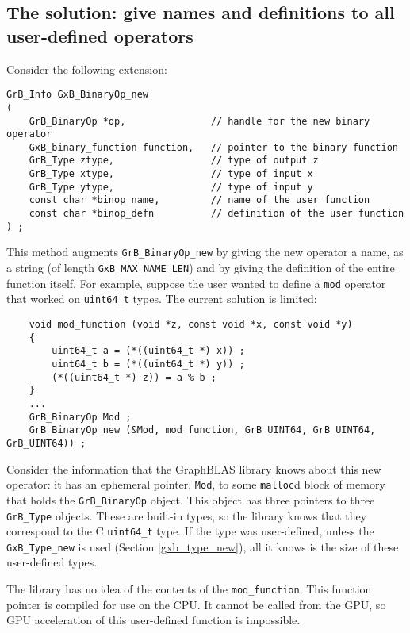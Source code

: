 \documentclass[12pt]{article}
\begin{document}
\subsection{The solution: give names and definitions to all user-defined
operators}

Consider the following extension:

{\footnotesize
\begin{verbatim}
GrB_Info GxB_BinaryOp_new
(
    GrB_BinaryOp *op,               // handle for the new binary operator
    GxB_binary_function function,   // pointer to the binary function
    GrB_Type ztype,                 // type of output z
    GrB_Type xtype,                 // type of input x
    GrB_Type ytype,                 // type of input y
    const char *binop_name,         // name of the user function
    const char *binop_defn          // definition of the user function
) ;
\end{verbatim}}

This method augments \verb'GrB_BinaryOp_new' by giving the new operator
a name, as a string (of length \verb'GxB_MAX_NAME_LEN') and by giving the
definition of the entire function itself.  For example, suppose the
user wanted to define a \verb'mod' operator that worked on \verb'uint64_t'
types.  The current solution is limited:

{\footnotesize
\begin{verbatim}
    void mod_function (void *z, const void *x, const void *y)
    {
        uint64_t a = (*((uint64_t *) x)) ;
        uint64_t b = (*((uint64_t *) y)) ;
        (*((uint64_t *) z)) = a % b ;
    }
    ...
    GrB_BinaryOp Mod ;
    GrB_BinaryOp_new (&Mod, mod_function, GrB_UINT64, GrB_UINT64, GrB_UINT64)) ;
\end{verbatim}}

Consider the information that the GraphBLAS library knows about this
new operator:  it has an ephemeral pointer, \verb'Mod', to some
\verb'malloc'd block of memory that holds the \verb'GrB_BinaryOp' 
object.  This object has three pointers to three \verb'GrB_Type' objects.
These are built-in types, so the library knows that they correspond
to the C \verb'uint64_t' type.  If the type was user-defined, unless the
\verb'GxB_Type_new' is used (Section \ref{gxb_type_new}), all it knows
is the size of these user-defined types.

The library has no idea of the contents of the \verb'mod_function'.  This
function pointer is compiled for use on the CPU.  It cannot be called from the
GPU, so GPU acceleration of this user-defined function is impossible.
\end{document}
